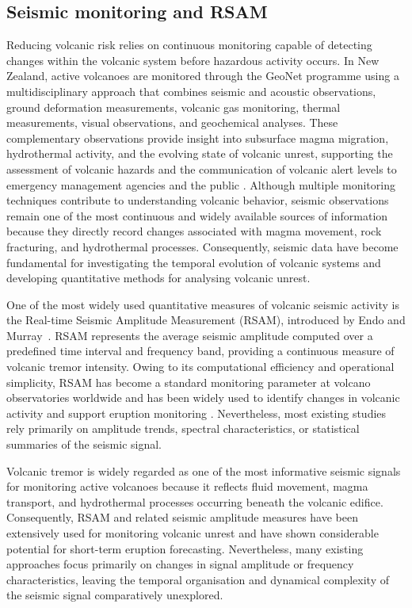 \documentclass[12pt,a4paper]{article}
\begin{document}
\subsection{Seismic monitoring and RSAM}

Reducing volcanic risk relies on continuous monitoring capable of detecting changes within the volcanic system before hazardous activity occurs. In New Zealand, active volcanoes are monitored through the GeoNet programme using a multidisciplinary approach that combines seismic and acoustic observations, ground deformation measurements, volcanic gas monitoring, thermal measurements, visual observations, and geochemical analyses. These complementary observations provide insight into subsurface magma migration, hydrothermal activity, and the evolving state of volcanic unrest, supporting the assessment of volcanic hazards and the communication of volcanic alert levels to emergency management agencies and the public \cite{GNSVolcanoMonitoring}. Although multiple monitoring techniques contribute to understanding volcanic behavior, seismic observations remain one of the most continuous and widely available sources of information because they directly record changes associated with magma movement, rock fracturing, and hydrothermal processes. Consequently, seismic data have become fundamental for investigating the temporal evolution of volcanic systems and developing quantitative methods for analysing volcanic unrest.

One of the most widely used quantitative measures of volcanic seismic activity is the Real-time Seismic Amplitude Measurement (RSAM), introduced by Endo and Murray~\cite{Endo1991}. RSAM represents the average seismic amplitude computed over a predefined time interval and frequency band, providing a continuous measure of volcanic tremor intensity. Owing to its computational efficiency and operational simplicity, RSAM has become a standard monitoring parameter at volcano observatories worldwide and has been widely used to identify changes in volcanic activity and support eruption monitoring \cite{Endo1991}. Nevertheless, most existing studies rely primarily on amplitude trends, spectral characteristics, or statistical summaries of the seismic signal.

Volcanic tremor is widely regarded as one of the most informative seismic signals for monitoring active volcanoes because it reflects fluid movement, magma transport, and hydrothermal processes occurring beneath the volcanic edifice. Consequently, RSAM and related seismic amplitude measures have been extensively used for monitoring volcanic unrest and have shown considerable potential for short-term eruption forecasting. Nevertheless, many existing approaches focus primarily on changes in signal amplitude or frequency characteristics, leaving the temporal organisation and dynamical complexity of the seismic signal comparatively unexplored.
\end{document}
